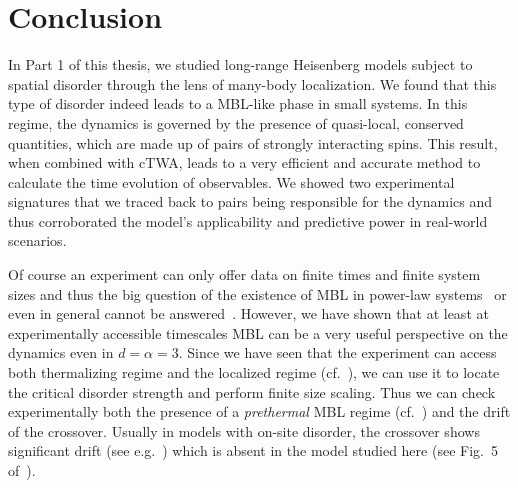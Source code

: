 \chapter{Conclusion}
In Part 1 of this thesis, we studied long-range Heisenberg models subject to spatial disorder through the lens of many-body localization. We found that this type of disorder indeed leads to a MBL-like phase in small systems. In this regime, the dynamics is governed by the presence of quasi-local, conserved quantities, which are made up of pairs of strongly interacting spins. This result, when combined with cTWA, leads to a very efficient and accurate method to calculate the time evolution of observables. We showed two experimental signatures that we traced back to pairs being responsible for the dynamics and thus corroborated the model's applicability and predictive power in real-world scenarios.

Of course an experiment can only offer data on finite times and finite system sizes and thus the big question of the existence of MBL in power-law systems~\cite{yaoManyBodyLocalizationDipolar2014,burinLocalizationRandomXY2015,burinManybodyDelocalizationStrongly2015,nandkishoreManyBodyLocalized2017} or even in general cannot be answered~\cite{deroeckStabilityInstabilityDelocalization2017,morningstarAvalanchesManybodyResonances2022,longPhenomenologyPrethermalManyBody2023,scoccoThermalizationPropagationFront2024}. However, we have shown that at least at experimentally accessible timescales MBL can be a very useful perspective on the dynamics even in $d=\alpha=3$. Since we have seen that the experiment can access both thermalizing regime and the localized regime (cf.~\cite{franzEmergentPairLocalization2022}), we can use it to locate the critical disorder strength and perform finite size scaling. Thus we can check experimentally both the presence of a \emph{prethermal} MBL regime (cf.~\cite{longPhenomenologyPrethermalManyBody2023}) and the drift of the crossover. Usually in models with on-site disorder, the crossover shows significant drift (see e.g.~\cite{luitzManybodyLocalizationEdge2015}) which is absent in the model studied here (see Fig.~5 of~\cite{braemerPairLocalizationDipolar2022}).  

